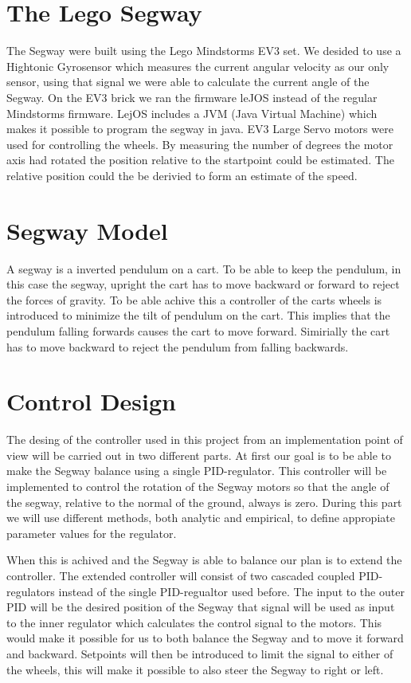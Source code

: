  \section{The Lego Segway}
 The Segway were built using the Lego Mindstorms EV3 set. We desided to use a Hightonic Gyrosensor which measures the current angular velocity as our only sensor, using that signal we were able to calculate the current angle of the Segway. On the EV3 brick we ran the firmware leJOS instead of the regular Mindstorms firmware. LejOS includes a JVM (Java Virtual Machine) which makes it possible to program the segway in java. EV3 Large Servo motors were used for controlling the wheels. By measuring the number of degrees the motor axis had rotated the position relative to the startpoint could be estimated. The relative position could the be derivied to form an estimate of the speed. 

\section{Segway Model}
A segway is a inverted pendulum on a cart. To be able to keep the pendulum, in this case the segway, upright the cart has to move backward or forward to reject the forces of gravity. To be able achive this a controller of the carts wheels is introduced to minimize the tilt of pendulum on the cart. This implies that the pendulum falling forwards causes the cart to move forward. Simirially the cart has to move backward to reject the pendulum from falling backwards. 


\section{Control Design}
The desing of the controller used in this project from an implementation point of view will be carried out in two different parts. 
At first our goal is to be able to make the Segway balance using a single PID-regulator. This controller will be implemented to control the rotation of the Segway motors so that the angle of the segway, relative to the normal of the ground, always is zero. During this part we will use different methods, both analytic and empirical, to define appropiate parameter values for the regulator. 

 When this is achived and the Segway is able to balance our plan is to extend the controller. The extended controller will consist of  two cascaded coupled PID-regulators instead of the single PID-regualtor used before. The input to the outer PID will be the desired position of the Segway that signal will be used as input to the inner regulator which calculates the control signal to the motors. This would make it possible for us to both balance the Segway and to move it forward and backward. Setpoints will then be introduced to limit the signal to either of the wheels, this will make it possible to also steer the Segway to right or left.



